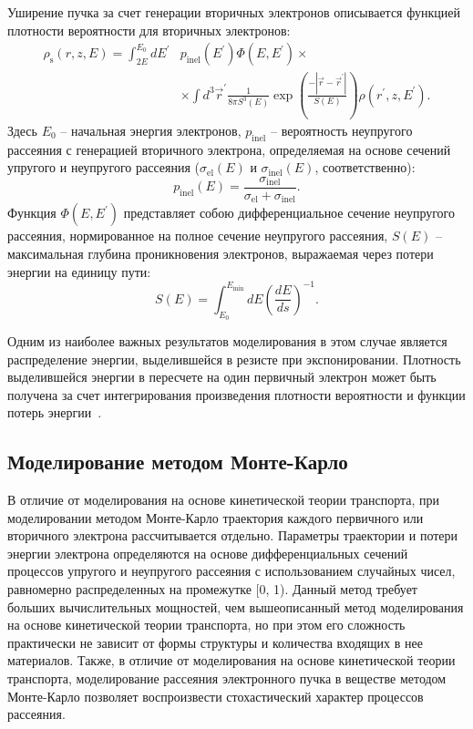 Уширение пучка за счет генерации вторичных электронов описывается функцией плотности вероятности для вторичных электронов:
\begin{equation} \label{eq:Boltzman_13_0}
	\begin{split}
		\rho_\mathrm{s}(r, z, E) = \int_{2 E}^{E_0} d E^{\prime} & p_\mathrm{inel} \left(E^{\prime}\right) \Phi\left(E, E^{\prime}\right) \times \\
		& \times \int d^3 \vec{r}^{\prime} \frac{1}{8 \pi S^3(E)} \exp \left(\frac{-\left|\vec{r}-\vec{r}^{\prime}\right|}{S(E)}\right) \rho\left(r^{\prime}, z, E^{\prime}\right).
	\end{split}
\end{equation}
Здесь $E_0$ -- начальная энергия электронов, $p_\mathrm{inel}$ -- вероятность неупругого рассеяния с генерацией вторичного электрона, определяемая на основе сечений упругого и неупругого рассеяния ($\sigma_\mathrm{el}(E)$ и $\sigma_\mathrm{inel}(E)$, соответственно):
\begin{equation} \label{eq:Boltzman_13}
	p_\mathrm{inel}(E) = \frac{\sigma_\mathrm{inel}}{\sigma_\mathrm{el}+\sigma_\mathrm{inel}}.
\end{equation}
Функция $\Phi\left(E, E^{\prime}\right)$ представляет собою дифференциальное сечение неупругого рассеяния, нормированное на полное сечение неупругого рассеяния, $S(E)$ -- максимальная глубина проникновения электронов, выражаемая через потери энергии на единицу пути:
\begin{equation} \label{eq:Boltzman_14}
	S(E)=\int_{E_0}^{E_{\min }} d E\left(\frac{d E}{d s}\right)^{-1}.
\end{equation}

Одним из наиболее важных результатов моделирования в этом случае является распределение энергии, выделившейся в резисте при экспонировании. Плотность выделившейся энергии в пересчете на один первичный электрон может быть получена за счет интегрирования произведения плотности вероятности и функции потерь энергии~\cite{ME_rev_64}.


\subsection{Моделирование методом Монте-Карло}
В отличие от моделирования на основе кинетической теории транспорта, при моделировании методом Монте-Карло траектория каждого первичного или вторичного электрона рассчитывается отдельно. Параметры траектории и потери энергии электрона определяются на основе дифференциальных сечений процессов упругого и неупругого рассеяния с использованием случайных чисел, равномерно распределенных на промежутке [0, 1). Данный метод требует больших вычислительных мощностей, чем вышеописанный метод моделирования на основе кинетической теории транспорта, но при этом его сложность практически не зависит от формы структуры и количества входящих в нее материалов. Также, в отличие от моделирования на основе кинетической теории транспорта, моделирование рассеяния электронного пучка в веществе методом Монте-Карло позволяет воспроизвести стохастический характер процессов рассеяния.

